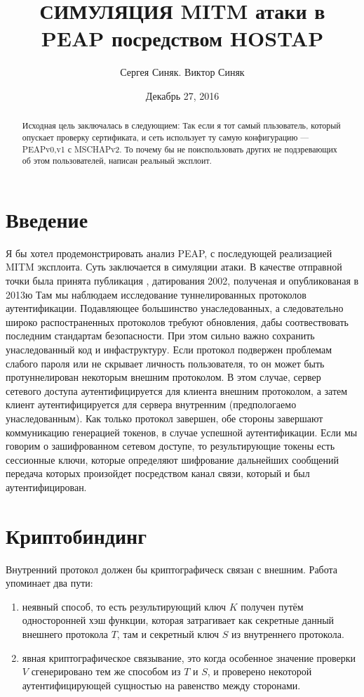 \documentclass{extarticle}
\begin{document}
\title{СИМУЛЯЦИЯ MITM атаки в PEAP посредством HOSTAP}

\date{Декабрь 27, 2016}

\author{Сергея Синяк. Виктор Синяк}

\begin{abstract}
  Исходная цель заключалась в следующием:
  Так если я тот самый пльзователь, который опускает
  проверку сертификата,
  и сеть использует ту самую конфигурацию ---
  PEAPv0,v1  с MSCHAPv2.
  То почему бы не поиспользовать других не подзревающих
  об этом пользователей,
  написан реальный эксплоит.
\end{abstract}

\maketitle

\section{Введение}

Я бы хотел продемонстрировать анализ PEAP,
с последующей реализацией MITM эксплоита.
Суть заключается в симуляции атаки.
В качестве отправной точки была принята публикация
\cite{tap2002},
датирования 2002, полученая и опубликованая в 2013ю
Там мы наблюдаем исследование туннелированных протоколов
аутентификации.
Подавляющее большинство унаследованных, а следовательно
широко распостраненных протоколов
требуют обновления, дабы соотвествовать последним
стандартам безопасности.
При этом сильно важно сохранить унаследованный код
и инфаструктуру.
Если протокол подвержен проблемам слабого пароля
или не скрывает личность пользователя,
то он может быть протуннелирован некоторым внешним протоколом.
В этом случае, сервер сетевого доступа
аутентифицируется для клиента внешним протоколом,
а затем клиент аутентифицируется для сервера внутренним
(предпологаемо унаследованным).
Как только протокол завершен, обе стороны завершают коммуникацию
генерацией токенов,
в случае успешной аутентификации.
Если мы говорим о зашифрованном сетевом доступе,
то результирующие токены есть сессионные ключи,
которые определяют шифрование дальнейших сообщений
передача которых произойдет посредством
канал связи, который и был аутентифицирован.

\section{Криптобиндинг}
Внутренний протокол должен бы криптографическ связан
с внешним.
Работа \cite{tap2002} упоминает два пути:
\begin{enumerate}
  \item неявный способ, то есть результирующий ключ $K$ получен
    путём односторонней хэш функции, которая затрагивает как секретные
    данный внешнего протокола $T$,
    там и секретный ключ $S$ из внутреннего протокола.
  \item явная криптографическое связывание, это когда
    особенное значение проверки $V$
    сгенерировано тем же способом из $T$ и $S$,
    и проверено некоторой аутентифицирующей сущностью
    на равенство между сторонами.
\end{enumerate}
\end{document}
